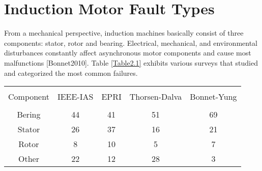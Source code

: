 
\section{Induction Motor Fault Types}

From a mechanical perspective, induction machines basically consist of three components: stator, rotor and bearing. Electrical, mechanical, and environmental disturbances constantly affect asynchronous motor components and cause most malfunctions [Bonnet2010]. Table \ref{Table2.1} exhibits various surveys that studied and categorized the most common failures. 

\begin{table*}[h]
	{\setlength{\tabcolsep}{14pt}
		\caption{Table with single row and centered columns.}
		\begin{center}
			\vspace{-6mm}
			\begin{tabular}{ccccc}
				\hline \\[-2.45ex] \hline \\[-2.1ex]
				Component & IEEE-IAS & EPRI & Thorsen-Dalva & Bonnet-Yung \\
				\hline \\[-1.8ex]
				Bering & 44 & 41 & 51 & 69 \\
				Stator & 26 & 37  & 16 & 21\\
				Rotor & 8 & 10 & 5 & 7 \\
				Other & 22 & 12  & 28 & 3\\
				\hline
			\end{tabular}
			\vspace{-6mm}
		\end{center}
		\label{Table2.1}}
\end{table*}

